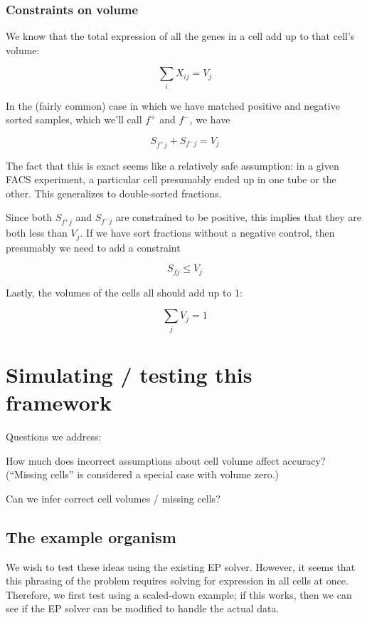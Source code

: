 \documentclass{article}
\begin{document}
\subsubsection{Constraints on volume}

We know that the total expression of all the genes in
a cell add up to that cell's volume:

\[
\sum_i X_{ij} = V_j
\]

In the (fairly common) case in which we have matched positive and negative
sorted samples, which we'll call $f^+$ and $f^-$, we have

\[
S_{f^+j} + S_{f^-j} = V_j
\]

The fact that this is exact seems like a relatively safe assumption:
in a given FACS experiment, a particular cell presumably ended up
in one tube or the other.
This generalizes to double-sorted fractions.

Since both $S_{f^+j}$ and $S_{f^-j}$ are constrained to be positive,
this implies that they are both less than $V_j$. If we have sort fractions
without a negative control, then presumably we need to add a constraint

\[
S_{fj} \le V_j
\]

Lastly, the volumes of the cells all should add up to 1:

\[
\sum_j V_j = 1
\]



\section{Simulating / testing this framework}


Questions we address:

How much does incorrect assumptions about cell volume affect accuracy?
(``Missing cells'' is considered a special case with volume zero.)

Can we infer correct cell volumes / missing cells?



\subsection{The example organism}

We wish to test these ideas using the existing EP solver. However, it
seems that this phrasing of the problem requires solving for expression
in all cells at once. Therefore, we first test using a scaled-down example;
if this works, then we can see if the EP solver can be modified to handle
the actual data.
\end{document}
